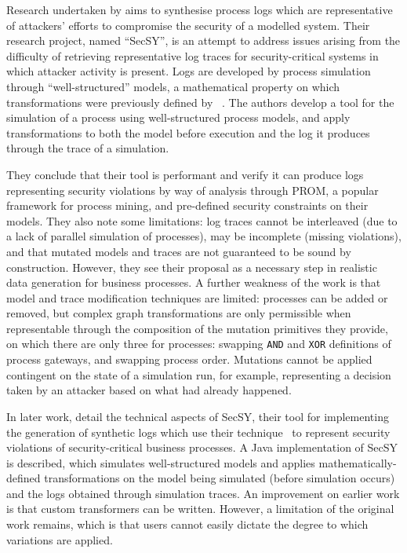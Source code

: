 Research undertaken by \citet{stocker2013secsy} aims to synthesise process logs
which are representative of attackers' efforts to compromise the security of a
modelled system. Their research project, named ``SecSY'', is an attempt to
address issues arising from the difficulty of retrieving representative log
traces for security-critical systems in which attacker activity is present. Logs
are developed by process simulation through ``well-structured'' models, a
mathematical property on which transformations were previously defined by
\citeauthor{vanhatalo2009refined}~\cite{vanhatalo2009refined}. The authors
develop a tool for the simulation of a process using well-structured process
models, and apply transformations to both the model before execution and the log
it produces through the trace of a simulation.

They conclude that their tool is performant and verify it can produce logs
representing security violations by way of analysis through PROM, a popular
framework for process mining, and pre-defined security constraints on their
models. They also note some limitations: log traces cannot be interleaved (due
to a lack of parallel simulation of processes), may be incomplete (missing
violations), and that mutated models and traces are not guaranteed to be sound
by construction. However, they see their proposal as a necessary step in
realistic data generation for business processes. A further weakness of the work
is that model and trace modification techniques are limited: processes can be
added or removed, but complex graph transformations are only permissible when
representable through the composition of the mutation primitives they provide,
on which there are only three for processes: swapping \lstinline{AND} and
\lstinline{XOR} definitions of process gateways, and swapping process order.
Mutations cannot be applied contingent on the state of a simulation run, for
example, representing a decision taken by an attacker based on what had already
happened.

In later work, \citeauthor{stocker2014secsy} detail the
technical aspects of SecSY, their tool for implementing the generation of
synthetic logs which use their technique~\cite{stocker2013secsy} to represent
security violations of security-critical business processes. A Java implementation
of SecSY is described, which simulates well-structured models and applies
mathematically-defined transformations on the model being simulated (before
simulation occurs) and the logs obtained through simulation traces. An
improvement on earlier work is that custom transformers can be written. However,
a limitation of the original work remains, which is that users cannot easily
dictate the degree to which variations are applied.

